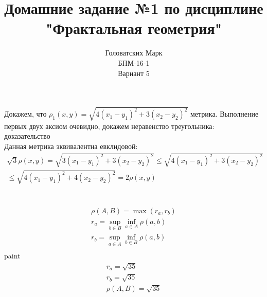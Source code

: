 \documentclass [a4paper,12pt]{article}
\title{Домашние задание №1 по дисциплине "Фрактальная геометрия"}
\author{Головатских Марк \\БПМ-16-1 \\ Вариант 5}
\date{}
\begin{document}
\maketitle
{}
\newpage
{}
\section{} %
Докажем, что $\rho_1(x,y)=\sqrt{4(x_1-y_1)^2 + 3(x_2 - y_2)^2}$ метрика. Выполнение первых двух аксиом очевидно, докажем неравенство треугольника:\\
доказательство\\
Данная метрика эквивалентна евклидовой:
\begin{multline*}
\sqrt{3}\rho(x,y) = \sqrt{3(x_1-y_1)^2 + 3(x_2 - y_2)^2} \leq \sqrt{4(x_1-y_1)^2 + 3(x_2 - y_2)^2}\\
 \leq \sqrt{4(x_1-y_1)^2 + 4(x_2 - y_2)^2} = 2\rho(x,y)
\end{multline*}
\section{} %
\begin{equation*}
  \begin{aligned}
    \rho(A, B) = \max(r_a, r_b)\\
    r_a = \sup_{b \in B}\inf_{a \in A}\rho(a, b)\\
    r_b = \sup_{a \in A}\inf_{b \in B}\rho(a, b)\\
  \end{aligned}
\end{equation*}
paint
\begin{equation*}
\begin{aligned}
r_a = \sqrt{35}\\
r_b = \sqrt{35}\\
\rho(A, B) = \sqrt{35}\\
\end{aligned}
\end{equation*}
\end{document}
